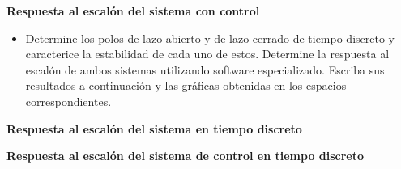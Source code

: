 \textbf{Respuesta al escalón del sistema con control}

\begin{itemize}
	\item Determine los polos de lazo abierto y de lazo cerrado de tiempo discreto y caracterice la estabilidad de
	cada uno de estos. Determine la respuesta al escalón de ambos sistemas utilizando software especializado.
	Escriba sus resultados a continuación y las gráficas obtenidas en los espacios correspondientes.
\end{itemize}

\textbf{Respuesta al escalón del sistema en tiempo discreto}

\textbf{Respuesta al escalón del sistema de control en tiempo discreto}